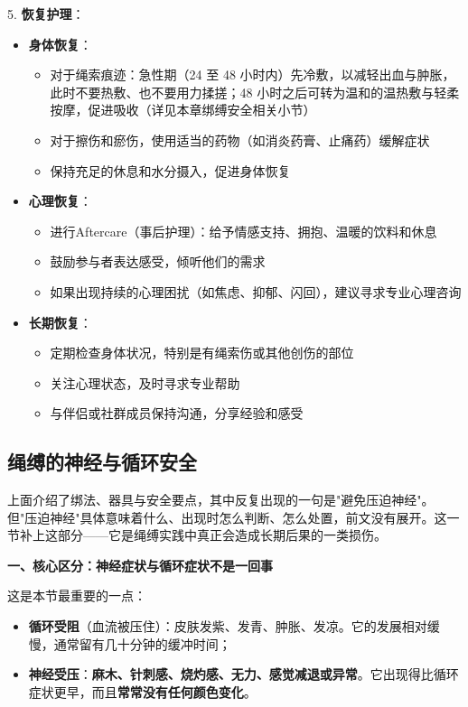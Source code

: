 \documentclass[12pt,UTF8]{ctexbook}
\begin{document}
5. \textbf{恢复护理}：
  \begin{itemize}
  \item \textbf{身体恢复}：
    \begin{itemize}
    \item 对于绳索痕迹：急性期（24 至 48 小时内）先冷敷，以减轻出血与肿胀，此时不要热敷、也不要用力揉搓；48 小时之后可转为温和的温热敷与轻柔按摩，促进吸收（详见本章绑缚安全相关小节）
    \item 对于擦伤和瘀伤，使用适当的药物（如消炎药膏、止痛药）缓解症状
    \item 保持充足的休息和水分摄入，促进身体恢复
    \end{itemize}
  \item \textbf{心理恢复}：
    \begin{itemize}
    \item 进行Aftercare（事后护理）：给予情感支持、拥抱、温暖的饮料和休息
    \item 鼓励参与者表达感受，倾听他们的需求
    \item 如果出现持续的心理困扰（如焦虑、抑郁、闪回），建议寻求专业心理咨询
    \end{itemize}
  \item \textbf{长期恢复}：
    \begin{itemize}
    \item 定期检查身体状况，特别是有绳索伤或其他创伤的部位
    \item 关注心理状态，及时寻求专业帮助
    \item 与伴侣或社群成员保持沟通，分享经验和感受
    \end{itemize}
  \end{itemize}

\subsection{绳缚的神经与循环安全}\label{sec:ropesafety}

上面介绍了绑法、器具与安全要点，其中反复出现的一句是"避免压迫神经"。但"压迫神经"具体意味着什么、出现时怎么判断、怎么处置，前文没有展开。这一节补上这部分——它是绳缚实践中真正会造成长期后果的一类损伤。

\textbf{一、核心区分：神经症状与循环症状不是一回事}

这是本节最重要的一点：

\begin{itemize}
\item \textbf{循环受阻}（血流被压住）：皮肤发紫、发青、肿胀、发凉。它的发展相对缓慢，通常留有几十分钟的缓冲时间；
\item \textbf{神经受压}：\textbf{麻木、针刺感、烧灼感、无力、感觉减退或异常}。它出现得比循环症状更早，而且\textbf{常常没有任何颜色变化}。
\end{itemize}
\end{document}
